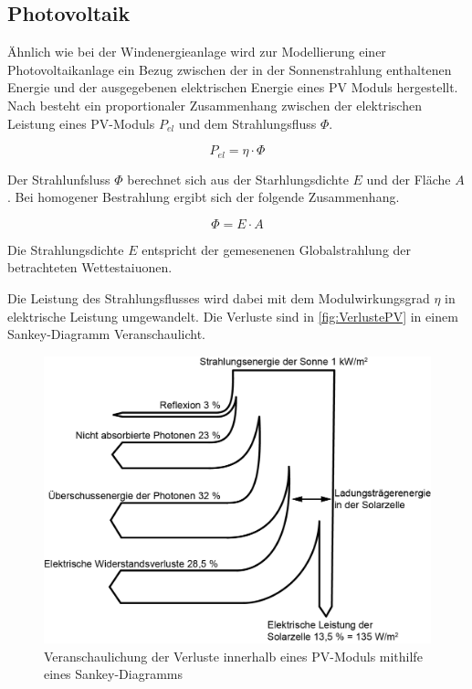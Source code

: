 \subsection{Photovoltaik}

Ähnlich wie bei der Windenergieanlage wird zur Modellierung einer Photovoltaikanlage ein Bezug zwischen der in der Sonnenstrahlung enthaltenen Energie und der ausgegebenen elektrischen Energie eines PV Moduls hergestellt. Nach \cite{PV} besteht ein proportionaler Zusammenhang zwischen der elektrischen Leistung eines PV-Moduls $P_{el}$ und dem Strahlungsfluss $\Phi$. 

\begin{equation}
	P_{el} = \eta \cdot \Phi
\end{equation}

Der Strahlunfsluss $\Phi$ berechnet sich aus der Starhlungsdichte $E$ und der Fläche $A$. Bei homogener Bestrahlung ergibt sich der folgende Zusammenhang.

\begin{equation}
	\Phi = E \cdot A
\end{equation}

Die Strahlungsdichte $E$ entspricht der gemesenenen Globalstrahlung der betrachteten Wettestaiuonen.

Die Leistung des Strahlungsflusses wird dabei mit dem Modulwirkungsgrad $\eta$ in elektrische Leistung umgewandelt. Die Verluste sind in \autoref{fig:VerlustePV} in einem Sankey-Diagramm Veranschaulicht. 

\begin{figure}[H]
	\centering
	\includegraphics[width=0.7\linewidth]{Abbildungen/WirkungsgradPV.png}
	\caption{Veranschaulichung der Verluste innerhalb eines PV-Moduls mithilfe eines Sankey-Diagramms \cite{VerlustePV}}
	\label{fig:VerlustePV}
\end{figure}

